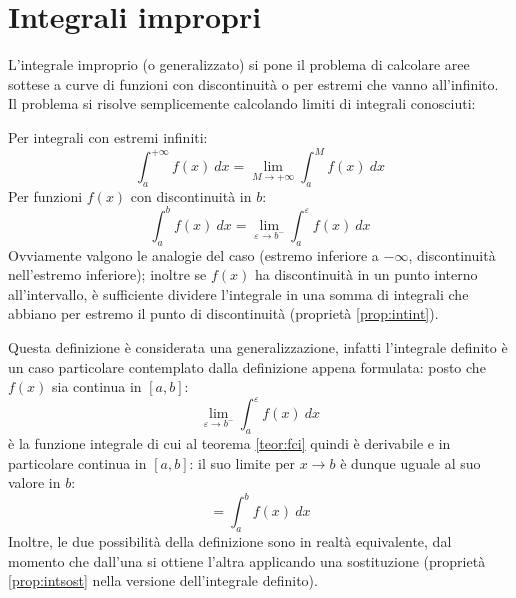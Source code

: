 %
%
%
%


\section{Integrali impropri}
L'integrale improprio (o generalizzato) si pone il problema di calcolare aree sottese a curve di funzioni con discontinuità o per estremi che vanno all'infinito. Il problema si risolve semplicemente calcolando limiti di integrali conosciuti:
\begin{defin}
	Per integrali con estremi infiniti:
	\begin{equation}
		\int_a^{+\infty}f(x)~dx=\lim_{M\to+\infty}\int_a^M f(x)~dx
	\end{equation}
	Per funzioni $f(x)$ con discontinuità in $b$:
	\begin{equation}
		\int_a^b f(x)~dx=\lim_{\varepsilon\to b^-}\int_a^\varepsilon f(x)~dx
	\end{equation}
	Ovviamente valgono le analogie del caso (estremo inferiore a $-\infty$, discontinuità nell'estremo inferiore); inoltre se $f(x)$ ha discontinuità in un punto interno all'intervallo, è sufficiente dividere l'integrale in una somma di integrali che abbiano per estremo il punto di discontinuità (proprietà \vref{prop:intint}).
\end{defin}
Questa definizione è considerata una generalizzazione, infatti l'integrale definito è un caso particolare contemplato dalla definizione appena formulata: posto che $f(x)$ sia continua in $[a,b]$:
\[
	\lim_{\varepsilon\to b^-} \int_a^\varepsilon f(x)~dx
\]
è la funzione integrale di cui al teorema \ref{teor:fci} quindi è derivabile e in particolare continua in $[a,b]$: il suo limite per $x\to b$ è dunque uguale al suo valore in $b$:
\[
	=\int_a^b f(x)~dx
\]
Inoltre, le due possibilità della definizione sono in realtà equivalente, dal momento che dall'una si ottiene l'altra applicando una sostituzione (proprietà \ref{prop:intsost} nella versione dell'integrale definito).

